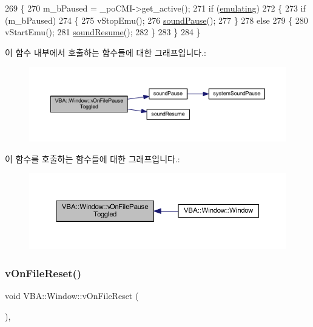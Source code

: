 \begin{DoxyCode}
269 \{
270   m\_bPaused = \_poCMI->get\_active();
271   \textcolor{keywordflow}{if} (\mbox{\hyperlink{gb_globals_8h_af9cc36078b1b311753963297ae7f2a74}{emulating}})
272   \{
273     \textcolor{keywordflow}{if} (m\_bPaused)
274     \{
275       vStopEmu();
276       \mbox{\hyperlink{_sound_8cpp_a0716e7957671de324eeaa4ac1729d6b7}{soundPause}}();
277     \}
278     \textcolor{keywordflow}{else}
279     \{
280       vStartEmu();
281       \mbox{\hyperlink{gb_sound_8cpp_af13240822604abd91b4e2370062f195e}{soundResume}}();
282     \}
283   \}
284 \}
\end{DoxyCode}
이 함수 내부에서 호출하는 함수들에 대한 그래프입니다.\+:
\nopagebreak
\begin{figure}[H]
\begin{center}
\leavevmode
\includegraphics[width=350pt]{class_v_b_a_1_1_window_a8cfc0cc364908602c3881304be30dfe4_cgraph}
\end{center}
\end{figure}
이 함수를 호출하는 함수들에 대한 그래프입니다.\+:
\nopagebreak
\begin{figure}[H]
\begin{center}
\leavevmode
\includegraphics[width=350pt]{class_v_b_a_1_1_window_a8cfc0cc364908602c3881304be30dfe4_icgraph}
\end{center}
\end{figure}
\mbox{\label{class_v_b_a_1_1_window_acd364daa2b85fc1c6b34d096305d8b48}} 
\subsubsection{\texorpdfstring{v\+On\+File\+Reset()}{vOnFileReset()}}
{\footnotesize\ttfamily void V\+B\+A\+::\+Window\+::v\+On\+File\+Reset (\begin{DoxyParamCaption}{ }\end{DoxyParamCaption})\hspace{0.3cm}{\ttfamily [protected]}, {\ttfamily [virtual]}}



